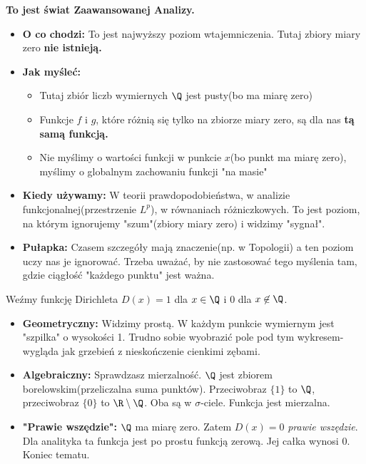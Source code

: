 \begin{enumerate}[label=\textbf{Poziom  \arabic*.}, wide]
		\textbf{To jest świat Zaawansowanej Analizy.}
		\begin{itemize}
			\item \textbf{O co chodzi:} To jest najwyższy poziom wtajemniczenia. Tutaj zbiory miary zero \textbf{nie istnieją.}
			\item \textbf{Jak myśleć:}
				\begin{itemize}
					\item Tutaj zbiór liczb wymiernych $\Q$ jest pusty(bo ma miarę zero)
					\item Funkcje $f$ i $g$, które różnią się tylko na zbiorze miary zero, są dla nas \textbf{tą samą funkcją.}
					\item Nie myślimy o wartości funkcji w punkcie $x$(bo punkt ma miarę zero), myślimy o globalnym zachowaniu funkcji "na masie"
				\end{itemize}
			\item \textbf{Kiedy używamy: } W teorii prawdopodobieństwa, w analizie funkcjonalnej(przestrzenie $L^{p}$), w równaniach różniczkowych. To jest poziom, na którym ignorujemy "szum"(zbiory miary zero) i  widzimy "sygnał".
			\item  \textbf{Pułapka: } Czasem szczegóły mają znaczenie(np. w Topologii) a ten poziom uczy nas je ignorować. Trzeba uważać, by nie zastosować tego myślenia tam, gdzie ciągłość "każdego punktu" jest ważna.
		\end{itemize}
\end{enumerate}
\begin{eg}
	Weźmy funkcję Dirichleta $D(x) = 1$ dla  $x\in \Q$ i $0$ dla $x\not\in \Q$.
	\begin{itemize}[label= \textbf{Poziom},wide]
		\item \textbf{Geometryczny:} Widzimy prostą. W każdym punkcie wymiernym jest "szpilka" o wysokości 1. Trudno sobie wyobrazić pole pod tym wykresem- wygląda jak grzebień z nieskończenie cienkimi zębami.
		\item \textbf{Algebraiczny:} Sprawdzasz mierzalność. $\Q$ jest zbiorem borelowskim(przeliczalna suma punktów). Przeciwobraz $\{1\} $ to $\Q$, przeciwobraz $\{0\} $ to $\R\setminus\Q$. Oba są w $\sigma$-ciele. Funkcja jest mierzalna.
		\item \textbf{"Prawie wszędzie":} $\Q$ ma miarę zero. Zatem $D(x) = 0$ \textit{prawie wszędzie}. Dla analityka ta funkcja jest po prostu funkcją zerową. Jej całka wynosi 0. Koniec tematu. 
	\end{itemize}
\end{eg} 
